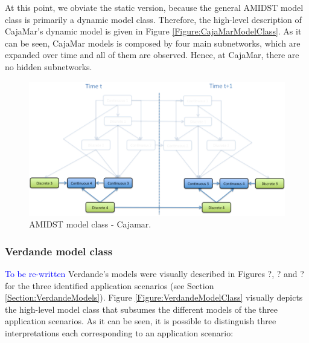 At this point, we obviate the static version, because the general AMIDST model class is primarily a dynamic model class. Therefore, the high-level description of CajaMar's dynamic model is given in Figure \ref{Figure:CajaMarModelClass}. As it can be seen, CajaMar models is composed by four main subnetworks, which are expanded over time and all of them are observed. Hence, at CajaMar, there are no hidden subnetworks. 


\begin{figure}[ht!]
\begin{center}
\includegraphics[scale=0.39]{./figures/AMIDSTModelClassCajamar.png}
\caption{\label{Figure:AMIDSTModelClassCajamar} AMIDST model class - Cajamar.}
\end{center}
\end{figure}


\subsubsection{Verdande model class}
\textcolor{blue}{To be re-written}
Verdande's models were visually described in Figures ?, ? and ? for the three identified application scenarios (see Section \ref{Section:VerdandeModels}). Figure \ref{Figure:VerdandeModelClass} visually depicts the high-level model class that subsumes the different models of the three application scenarios. As it can be seen, it is possible to distinguish three interpretations each corresponding to an application scenario:

